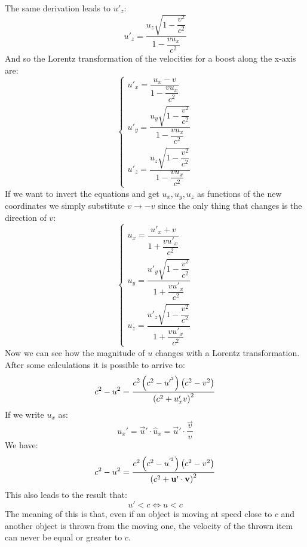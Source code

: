The same derivation leads to $u'_z$:
\begin{equation}
  u'_z = \dfrac{u_z\sqrt{1-\dfrac{v^2}{c^2}}}{1 - \dfrac{v u_x}{c^2}}
\end{equation}
And so the Lorentz transformation of the velocities for a boost along the x-axis are:
\begin{equation}
  \begin{cases}
    u'_x = \dfrac{u_x - v}{1 - \dfrac{v u_x}{c^2}} \\[18pt]
    u'_y = \dfrac{u_y\sqrt{1-\dfrac{v^2}{c^2}}}{1 - \dfrac{v u_x}{c^2}} \\[18pt]
    u'_z = \dfrac{u_z\sqrt{1-\dfrac{v^2}{c^2}}}{1 - \dfrac{v u_x}{c^2}}
  \end{cases}
\end{equation}
If we want to invert the equations and get $u_x, u_y, u_z$ as functions of the new coordinates we simply substitute $v \rightarrow -v$ since the only thing that changes is the direction of $v$:
\begin{equation}
  \begin{cases}
    u_x = \dfrac{u'_x + v}{1 + \dfrac{v u'_x}{c^2}} \\[18pt]
    u_y = \dfrac{u'_y\sqrt{1-\dfrac{v^2}{c^2}}}{1 + \dfrac{v u'_x}{c^2}} \\[18pt]
    u_z = \dfrac{u'_z\sqrt{1-\dfrac{v^2}{c^2}}}{1 + \dfrac{v u'_x}{c^2}}
  \end{cases}
\end{equation}
Now we can see how the magnitude of $u$ changes with a Lorentz transformation. After some calculations it is possible to arrive to:
\begin{equation}
  c^2 - u^2 = \dfrac{c^2\left(c^2 - u'^{^2}\right)\left(c^2 - v^2\right)}{\left(c^2 + u'_x v\right)^2}
\end{equation}
If we write $u_x$ as:
\begin{equation}
  u_x' = \vec{u}' \cdot \hat{u}_x = \vec{u}' \cdot \dfrac{\vec{v}}{v}
\end{equation}
We have:
\begin{equation}
  c^2 - u^2 = \dfrac{c^2\left(c^2 - u^{'^2}\right)\left(c^2 - v^2\right)}{\left(c^2 + \vb{u}'\cdot\vb{v}\right)^2}
\end{equation}
This also leads to the result that:
\begin{equation}
  u' < c \iff u < c
\end{equation}
The meaning of this is that, even if an object is moving at speed close to $c$ and another object is thrown from the moving one, the velocity of the thrown item can never be equal or greater to $c$.\\

